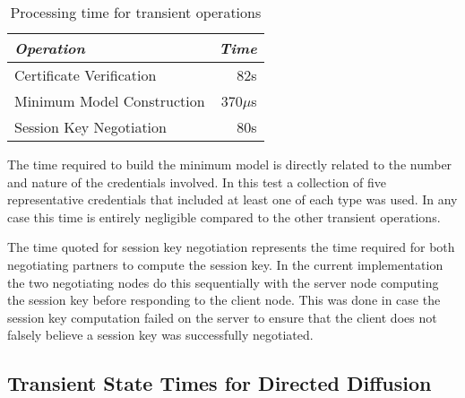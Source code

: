 \begin{table}[tbhp]
  \newcommand\T{\rule{0pt}{2.1ex}}
  \centering
  \caption{Processing time for transient operations}
  {
  \begin{tabular}{|l|r|} \hline
    \textit{Operation} \T & \textit{Time} \\ \hline \hline

    Certificate Verification     \T &  82s \\ \hline 
    Minimum Model Construction   \T & 370$\mu$s \\ \hline
    Session Key Negotiation      \T &  80s\\ \hline
  \end{tabular}
  }
  \label{table-transient-time}
\end{table}

The time required to build the minimum model is directly related to the number and nature of the
credentials involved. In this test a collection of five representative credentials that included
at least one of each type was used. In any case this time is entirely negligible compared to the
other transient operations.


The time quoted for session key negotiation represents the time required for both negotiating
partners to compute the session key. In the current implementation the two negotiating nodes do
this sequentially with the server node computing the session key before responding to the client
node. This was done in case the session key computation failed on the server to ensure that the
client does not falsely believe a session key was successfully negotiated.

\subsection{Transient State Times for Directed Diffusion}

